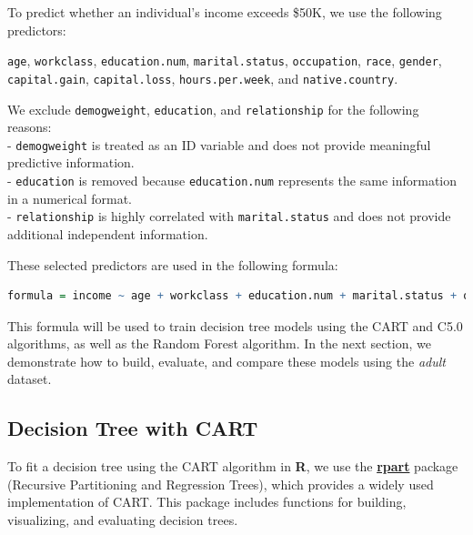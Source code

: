 \documentclass[
]{book}
\newcommand{\passthrough}[1]{#1}
\theoremstyle{definition}
\theoremstyle{definition}
\theoremstyle{definition}
\theoremstyle{definition}
\theoremstyle{remark}
\begin{document}
To predict whether an individual's income exceeds \$50K, we use the following predictors:

\passthrough{\lstinline!age!}, \passthrough{\lstinline!workclass!}, \passthrough{\lstinline!education.num!}, \passthrough{\lstinline!marital.status!}, \passthrough{\lstinline!occupation!}, \passthrough{\lstinline!race!}, \passthrough{\lstinline!gender!}, \passthrough{\lstinline!capital.gain!}, \passthrough{\lstinline!capital.loss!}, \passthrough{\lstinline!hours.per.week!}, and \passthrough{\lstinline!native.country!}.

We exclude \passthrough{\lstinline!demogweight!}, \passthrough{\lstinline!education!}, and \passthrough{\lstinline!relationship!} for the following reasons:\\
- \passthrough{\lstinline!demogweight!} is treated as an ID variable and does not provide meaningful predictive information.\\
- \passthrough{\lstinline!education!} is removed because \passthrough{\lstinline!education.num!} represents the same information in a numerical format.\\
- \passthrough{\lstinline!relationship!} is highly correlated with \passthrough{\lstinline!marital.status!} and does not provide additional independent information.

These selected predictors are used in the following formula:

\begin{lstlisting}[language=R]
formula = income ~ age + workclass + education.num + marital.status + occupation + race + gender + capital.gain + capital.loss + hours.per.week + native.country
\end{lstlisting}

This formula will be used to train decision tree models using the CART and C5.0 algorithms, as well as the Random Forest algorithm. In the next section, we demonstrate how to build, evaluate, and compare these models using the \emph{adult} dataset.

\subsection*{Decision Tree with CART}\label{decision-tree-with-cart}

To fit a decision tree using the CART algorithm in \textbf{R}, we use the \href{https://CRAN.R-project.org/package=rpart}{\textbf{rpart}} package (Recursive Partitioning and Regression Trees), which provides a widely used implementation of CART. This package includes functions for building, visualizing, and evaluating decision trees.
\end{document}
